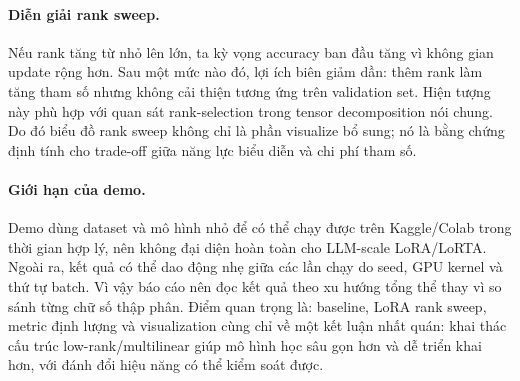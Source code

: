 \paragraph{Diễn giải rank sweep.}
Nếu rank tăng từ nhỏ lên lớn, ta kỳ vọng accuracy ban đầu tăng vì không gian update
rộng hơn. Sau một mức nào đó, lợi ích biên giảm dần: thêm rank làm tăng tham số nhưng
không cải thiện tương ứng trên validation set. Hiện tượng này phù hợp với quan sát
rank-selection trong tensor decomposition nói chung. Do đó biểu đồ rank sweep không chỉ
là phần visualize bổ sung; nó là bằng chứng định tính cho trade-off giữa năng lực biểu
diễn và chi phí tham số.

\paragraph{Giới hạn của demo.}
Demo dùng dataset và mô hình nhỏ để có thể chạy được trên Kaggle/Colab trong thời gian
hợp lý, nên không đại diện hoàn toàn cho LLM-scale LoRA/LoRTA. Ngoài ra, kết quả có thể
dao động nhẹ giữa các lần chạy do seed, GPU kernel và thứ tự batch. Vì vậy báo cáo nên
đọc kết quả theo xu hướng tổng thể thay vì so sánh từng chữ số thập phân. Điểm quan
trọng là: baseline, LoRA rank sweep, metric định lượng và visualization cùng chỉ về một
kết luận nhất quán: khai thác cấu trúc low-rank/multilinear giúp mô hình học sâu gọn
hơn và dễ triển khai hơn, với đánh đổi hiệu năng có thể kiểm soát được.
